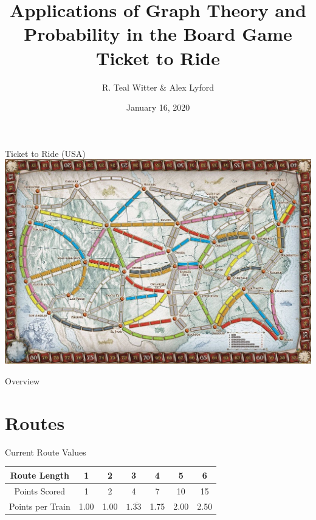 \documentclass[12pt]{beamer}
\title{Applications of Graph Theory and Probability
in the Board Game Ticket to Ride}
\author{R. Teal Witter \& Alex Lyford}
\institute{Middlebury College}
\date{January 16, 2020}
\begin{document}
\frame{\titlepage}

\begin{frame}{Ticket to Ride (USA)}
    \centering
    \includegraphics[scale=.3]{figures/board}
\end{frame}

\begin{frame}{Overview}
    \tableofcontents
\end{frame}

\section{Routes}

\begin{frame}{Current Route Values}
    \begin{center}
    \renewcommand{\arraystretch}{2}
    \begin{tabular}{| c | c | c | c | c | c | c |}
    \hline
     Route Length & 1 & 2 & 3 & 4 & 5 & 6\\
     \hline
     Points Scored & 1 & 2 & 4 & 7 & 10 & 15\\
     \hline
     Points per Train & 1.00 & 1.00 & $1.\overline{33}$ 
     & 1.75 & 2.00 & 2.50\\
     \hline
    \end{tabular}
    \end{center}
\end{frame}
\end{document}
